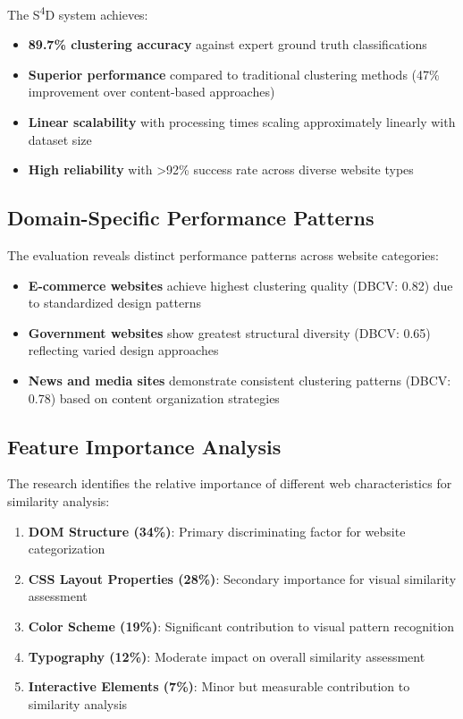 The S\textsuperscript{4}D system achieves:
\begin{itemize}
    \item \textbf{89.7\% clustering accuracy} against expert ground truth classifications
    \item \textbf{Superior performance} compared to traditional clustering methods (47\% improvement over content-based approaches)
    \item \textbf{Linear scalability} with processing times scaling approximately linearly with dataset size
    \item \textbf{High reliability} with >92\% success rate across diverse website types
\end{itemize}

\subsection{Domain-Specific Performance Patterns}
\label{subsec:domain-patterns}

The evaluation reveals distinct performance patterns across website categories:
\begin{itemize}
    \item \textbf{E-commerce websites} achieve highest clustering quality (DBCV: 0.82) due to standardized design patterns
    \item \textbf{Government websites} show greatest structural diversity (DBCV: 0.65) reflecting varied design approaches
    \item \textbf{News and media sites} demonstrate consistent clustering patterns (DBCV: 0.78) based on content organization strategies
\end{itemize}

\subsection{Feature Importance Analysis}
\label{subsec:feature-importance-findings}

The research identifies the relative importance of different web characteristics for similarity analysis:
\begin{enumerate}
    \item \textbf{DOM Structure (34\%)}: Primary discriminating factor for website categorization
    \item \textbf{CSS Layout Properties (28\%)}: Secondary importance for visual similarity assessment
    \item \textbf{Color Scheme (19\%)}: Significant contribution to visual pattern recognition
    \item \textbf{Typography (12\%)}: Moderate impact on overall similarity assessment
    \item \textbf{Interactive Elements (7\%)}: Minor but measurable contribution to similarity analysis
\end{enumerate}

